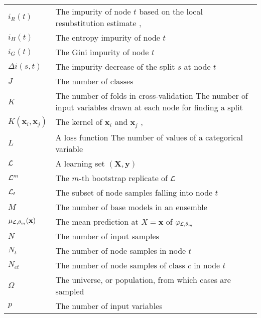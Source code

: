 \begin{tabularx}{\textwidth}{ l X }
$i_R(t)$ & The impurity of node $t$ based on the local resubstitution estimate \dotfill \pageref{eqn:impurity:error},~\pageref{eqn:impurity:variance}\\
$i_H(t)$ & The entropy impurity of node $t$ \dotfill  \pageref{eqn:impurity:shannon}\\
$i_G(t)$ & The Gini impurity of node $t$ \dotfill  \pageref{eqn:impurity:gini}\\
$\Delta i(s, t)$ & The impurity decrease of the split $s$ at node $t$ \dotfill  \pageref{def:impurity-decrease}\\
$J$ & The number of classes \dotfill  \pageref{ntn:J}\\
$K$ & The number of folds in cross-validation \dotfill  \pageref{ntn:K-cv} \newline The number of input variables drawn at each node for finding a split \dotfill \pageref{ntn:K-split} \\
$K(\mathbf{x}_i, \mathbf{x}_j)$ & The kernel of $\mathbf{x}_i$ and $\mathbf{x}_j$ \dotfill \pageref{ntn:kernel}, \pageref{ntn:kernel2}\\
$L$ & A loss function \dotfill  \pageref{ntn:L}\newline The number of values of a categorical variable \dotfill \pageref{ntn:L2}\\
${\cal L}$ & A learning set $(\mathbf{X}, \mathbf{y})$ \dotfill  \pageref{ntn:learning-set}\\
${\cal L}^m$ & The $m$-th bootstrap replicate of ${\cal L}$ \dotfill  \pageref{ntn:L_m}\\
${\cal L}_t$ & The subset of node samples falling into node $t$ \dotfill  \pageref{ntn:L_t}\\
$M$ & The number of base models in an ensemble \dotfill  \pageref{ntn:M}\\
$\mu_{{\cal L},\theta_m}(\mathbf{x})$ & The mean prediction at $X = \mathbf{x}$ of $\varphi_{{\cal L},\theta_m}$ \dotfill \pageref{eqn:4:mu} \\
$N$ & The number of input samples \dotfill  \pageref{ntn:N}\\
$N_t$ & The number of node samples in node $t$ \dotfill  \pageref{ntn:N_t}\\
$N_{ct}$ & The number of node samples of class $c$ in node $t$ \dotfill  \pageref{ntn:N_ct}\\
$\Omega$ & The universe, or population, from which cases are sampled \dotfill  \pageref{ntn:omega}\\
$p$ & The number of input variables \dotfill  \pageref{ntn:p}\\

\end{tabularx}
